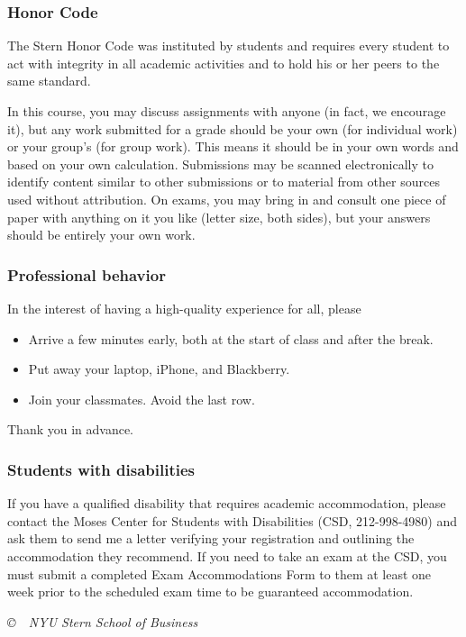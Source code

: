 \documentclass[12pt]{article}
\begin{document}
\subsubsection*{Honor Code}

The Stern Honor Code was instituted by students
and requires every student to act with integrity in all
academic activities and to hold his or her peers to the same
standard.

In this course, you may discuss assignments with anyone
(in fact, we encourage it), but any work submitted for a
grade should be your own (for individual work) or your group's
(for group work).
This means it should be in your own words and based on your own calculation.
Submissions may be scanned electronically to identify
content similar to other submissions or to material from other sources
used without attribution.
On exams, you may bring in and consult one piece
of paper with anything on it you like (letter size, both sides),
but your answers should be entirely your own work.

\subsubsection*{Professional behavior}

In the interest of having a high-quality experience for all,
please
%
\begin{itemize}
\item Arrive a few minutes early,
both at the start of class and after the break.

\item Put away your laptop, iPhone, and Blackberry.

\item Join your classmates.
Avoid the last row.
%
\end{itemize}
Thank you in advance.


\subsubsection*{Students with disabilities}

If you have a qualified disability that requires academic accommodation,
please contact the Moses Center for Students with Disabilities (CSD, 212-998-4980) and ask them to
send me a letter verifying your registration and outlining the accommodation they recommend.
If you need to take an exam at the CSD,
you must submit a completed Exam Accommodations Form to them
at least one week prior to the scheduled exam time to be guaranteed accommodation.

\vfill
\centerline{\it \copyright \ \number\year \ NYU Stern School of Business}
\end{document}
